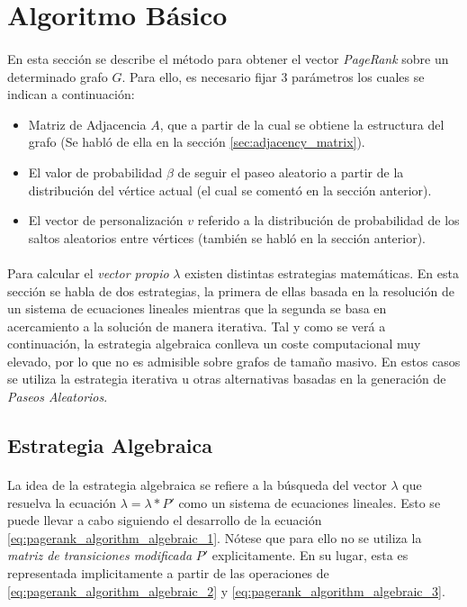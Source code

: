 \documentclass{subfiles}
\begin{document}
    \section{Algoritmo Básico}
    \label{sec:pagerank_algorithm}

      \paragraph{}
      En esta sección se describe el método para obtener el vector \emph{PageRank} sobre un determinado grafo $G$. Para ello, es necesario fijar 3 parámetros los cuales se indican a continuación:
      \begin{itemize}
        \item Matriz de Adjacencia $A$, que a partir de la cual se obtiene la estructura del grafo (Se habló de ella en la sección \ref{sec:adjacency_matrix}).
        \item El valor de probabilidad $\beta$ de seguir el paseo aleatorio a partir de la distribución del vértice actual (el cual se comentó en la sección anterior).
        \item El vector de personalización $v$ referido a la distribución de probabilidad de los saltos aleatorios entre vértices (también se habló en la sección anterior).
      \end{itemize}



      \paragraph{}
      Para calcular el \emph{vector propio} $\lambda$ existen distintas estrategias matemáticas. En esta sección se habla de dos estrategias, la primera de ellas basada en la resolución de un sistema de ecuaciones lineales mientras que la segunda se basa en acercamiento a la solución de manera iterativa. Tal y como se verá a continuación, la estrategia algebraica conlleva un coste computacional muy elevado, por lo que no es admisible sobre grafos de tamaño masivo. En estos casos se utiliza la estrategia iterativa u otras alternativas basadas en la generación de \emph{Paseos Aleatorios}.


      \subsection{Estrategia Algebraica}
      \label{sec:pagerank_algorithm_algebraic}

        \paragraph{}
        La idea de la estrategia algebraica se refiere a la búsqueda del vector $\lambda$ que resuelva la ecuación $\lambda = \lambda * P'$ como un sistema de ecuaciones lineales. Esto se puede llevar a cabo siguiendo el desarrollo de la ecuación \eqref{eq:pagerank_algorithm_algebraic_1}. Nótese que para ello no se utiliza la \emph{matriz de transiciones modificada} $P'$ explicitamente. En su lugar, esta es representada implicitamente a partir de las operaciones de \eqref{eq:pagerank_algorithm_algebraic_2} y \eqref{eq:pagerank_algorithm_algebraic_3}.
\end{document}

